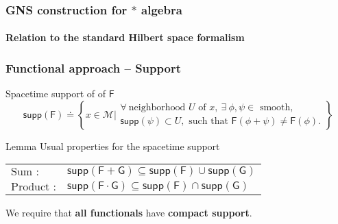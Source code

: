\documentclass[9pt]{beamer}
\newcommand{\supp}{\mathsf{supp}} %
\newcommand{\Mcal}{\mathcal{M}}
\newcommand{\Fsf}{\mathsf{F}}
\newcommand{\Gsf}{\mathsf{G}}
\begin{document}

\begin{frame}

\frametitle{GNS construction for $\ast$ algebra}
\framesubtitle{Relation to the standard Hilbert space formalism}


 
\end{frame}  


\begin{frame}

\frametitle{Functional approach -- Support}

\begin{block}{Spacetime support of of $\Fsf$}
%
\vspace*{-8pt}
%
\begin{equation*}
\supp(\Fsf) \doteq \left\{ x \in \Mcal \bigg| 
\begin{array}{l} 
\forall \ \mbox{neighborhood } U \mbox{ of } x, \ \exists \ \phi, \psi \in \mbox{ smooth}, \\
\supp(\psi) \subset U, \mbox{ such that } \Fsf(\phi + \psi) \neq \Fsf(\phi).
\end{array}
\right\}
\end{equation*}
%
\end{block}

\vfill

\begin{block}{Lemma}
Usual properties for the spacetime support
\begin{tabular}{ll}
\qquad $\mbox{Sum :}$ &  $\supp(\Fsf + \Gsf) \subseteq \supp(\Fsf) \cup \supp(\Gsf)$ \\
\qquad $\mbox{Product :}$ & $\supp(\Fsf \cdot \Gsf) \subseteq \supp(\Fsf) \cap \supp(\Gsf)$
\end{tabular}
\end{block}

\vfill

We require that \textbf{all functionals} have \textbf{compact support}.

\end{frame}

\end{document}
